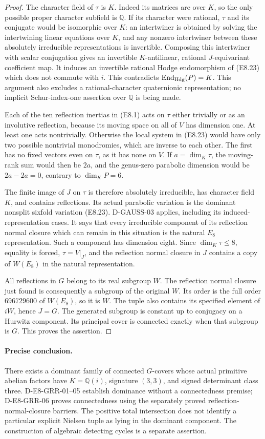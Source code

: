 \begin{proof}
The character field of $\tau$ is $K$.  Indeed its matrices are
over $K$, so the only possible proper character subfield is
$\mathbb Q$.  If its character were rational, $\tau$ and its
conjugate would be isomorphic over $K$: an intertwiner is
obtained by solving the intertwining linear equations over
$K$, and any nonzero intertwiner between these absolutely
irreducible representations is invertible.  Composing this
intertwiner with scalar conjugation gives an invertible
$K$-antilinear, rational $J$-equivariant coefficient map.
It induces an invertible rational Hodge endomorphism of (E8.23)
which does not commute with $i$.  This contradicts
$\operatorname{End}_{\rm Hdg}(P)=K$.  This argument also excludes
a rational-character quaternionic representation; no implicit
Schur-index-one assertion over $\mathbb Q$ is being made.

Each of the ten reflection inertias in (E8.1) acts on $\tau$
either trivially or as an involutive reflection, because its
moving space on all of $V$ has dimension one.  At least one
acts nontrivially.  Otherwise the local system in (E8.23)
would have only two possible nontrivial monodromies, which
are inverse to each other.  The first has no fixed vectors
even on $\tau$, as it has none on $V$.  If $a=\dim_K\tau$,
the moving-rank sum would then be $2a$, and the genus-zero
parabolic dimension would be $2a-2a=0$, contrary to
$\dim_KP=6$.

The finite image of $J$ on $\tau$ is therefore absolutely
irreducible, has character field $K$, and contains reflections.
Its actual parabolic variation is the dominant nonsplit
sixfold variation (E8.23).  D-GAUSS-03 applies, including its
induced-representation cases.  It says that every irreducible
component of its reflection normal closure which can remain
in this situation is the natural $E_8$ representation.
Such a component has dimension eight.  Since
$\dim_K\tau\le8$, equality is forced, $\tau=V|_J$, and the
reflection normal closure in $J$ contains a copy of $W(E_8)$
in the natural representation.

All reflections in $G$ belong to its real subgroup $W$.
The reflection normal closure just found is consequently a
subgroup of the original $W$.  Its order is the full order
$696729600$ of $W(E_8)$, so it is $W$.  The tuple also
contains its specified element of $iW$, hence $J=G$.
The generated subgroup is constant up to conjugacy on a
Hurwitz component.  Its principal cover is connected exactly
when that subgroup is $G$.  This proves the assertion.
\end{proof}

\paragraph{Precise conclusion.}
There exists a dominant family of connected $G$-covers whose
actual primitive abelian factors have $K=\mathbb Q(i)$,
signature $(3,3)$, and signed determinant class three.
D-E8-GRR-01--05 establish dominance without a connectedness
premise; D-E8-GRR-06 proves connectedness using the separately
proved reflection-normal-closure barriers.  The positive total
intersection does not identify a particular explicit Nielsen
tuple as lying in the dominant component.  The construction of
algebraic detecting cycles is a separate assertion.
